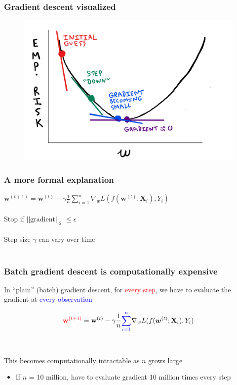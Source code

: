 \documentclass{beamer}
\begin{document}
\begin{frame}
	\frametitle{Gradient descent visualized}
	\begin{figure}[h]
	\centering
	\includegraphics[scale=0.33]{Sketch}
	\end{figure}
\end{frame}

\begin{frame}
	\frametitle{A more formal explanation}

	$\mathbf{w}^{(t+1)} = \mathbf{w}^{(t)} - \gamma \frac{1}{n}\sum_{i=1}^n
	\nabla_w L(f(\bm{w}^{(t)}; \mathbf{X}_i), Y_i)$ \\~\\

	Stop if $||\mathrm{gradient}||_2$ $\leq \epsilon$ \\~\\

	Step size $\gamma$ can vary over time \\~\\

\end{frame}

\begin{frame}
	\frametitle{Batch gradient descent is computationally expensive}
	In ``plain'' (batch) gradient descent, for \textcolor{red}{every step}, 
	we have to evaluate the gradient at \textcolor{blue} {every observation}

	$$
	\textcolor{red}{\mathbf{w}^{(t+1)}} = \mathbf{w}^{(t)} - \gamma \frac{1}{n}
	\textcolor{blue}{\sum_{i=1}^n}
	\nabla_w L(f(\bm{w}^{(t)}; \mathbf{X}_i), Y_i)
	$$\\~\\

	This becomes computationally intractable as $n$ grows large 
	\begin{itemize}
		\item \small If $n$ = 10 million, have to evaluate 
			gradient 10 million times every step
	\end{itemize}
\end{frame}
\end{document}
